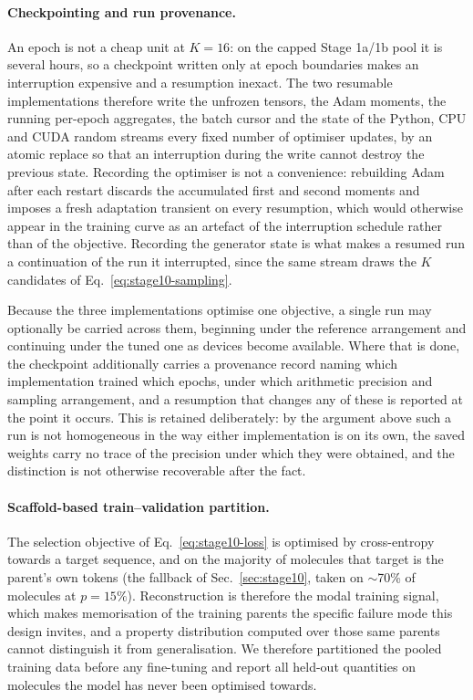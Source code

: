 \paragraph{Checkpointing and run provenance.}
An epoch is not a cheap unit at $K=16$: on the capped Stage 1a/1b pool it is
several hours, so a checkpoint written only at epoch boundaries makes an
interruption expensive and a resumption inexact. The two resumable
implementations therefore write the unfrozen tensors, the Adam moments, the
running per-epoch aggregates, the batch cursor and the state of the Python,
CPU and CUDA random streams every fixed number of optimiser updates, by an
atomic replace so that an interruption during the write cannot destroy the
previous state. Recording the optimiser is not a convenience: rebuilding Adam
after each restart discards the accumulated first and second moments and
imposes a fresh adaptation transient on every resumption, which would otherwise
appear in the training curve as an artefact of the interruption schedule rather
than of the objective. Recording the generator state is what makes a resumed
run a continuation of the run it interrupted, since the same stream draws the
$K$ candidates of Eq.~\eqref{eq:stage10-sampling}.

Because the three implementations optimise one objective, a single run may
optionally be carried across them, beginning under the reference arrangement
and continuing under the tuned one as devices become available. Where that is
done, the checkpoint additionally carries a provenance record naming which
implementation trained which epochs, under which arithmetic precision and
sampling arrangement, and a resumption that changes any of these is reported at
the point it occurs. This is retained deliberately: by the argument above such
a run is not homogeneous in the way either implementation is on its own, the
saved weights carry no trace of the precision under which they were obtained,
and the distinction is not otherwise recoverable after the fact.

\paragraph{Scaffold-based train--validation partition.}
The selection objective of Eq.~\eqref{eq:stage10-loss} is optimised by
cross-entropy towards a target sequence, and on the majority of molecules that
target is the parent's own tokens (the fallback of
Sec.~\ref{sec:stage10}, taken on $\sim$70\% of molecules at $p=15\%$).
Reconstruction is therefore the modal training signal, which makes
memorisation of the training parents the specific failure mode this design
invites, and a property distribution computed over those same parents cannot
distinguish it from generalisation. We therefore partitioned the pooled
training data before any fine-tuning and report all held-out quantities on
molecules the model has never been optimised towards.

